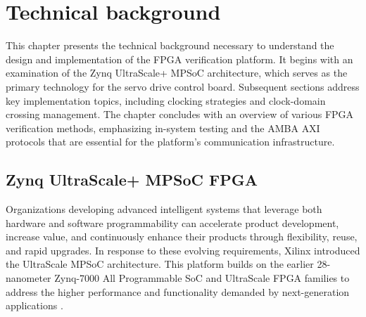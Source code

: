 \chapter{Technical background}
\label{ch:TechBackground}

This chapter presents the technical background necessary to understand the design and implementation of the \acs{FPGA} verification platform. It begins with an examination of the Zynq UltraScale+ \acs{MPSoC} architecture, which serves as the primary technology for the servo drive control board. Subsequent sections address key implementation topics, including clocking strategies and clock-domain crossing management. The chapter concludes with an overview of various \acs{FPGA} verification methods, emphasizing in-system testing and the \acs{AMBA} \acs{AXI} protocols that are essential for the platform's communication infrastructure.

\section{Zynq UltraScale+ \acs{MPSoC} \acs{FPGA}}
\label{sec:TechBackground:Zynq_UltraScale+_MPSoc} 
Organizations developing advanced intelligent systems that leverage both hardware and software programmability can accelerate product development, increase value, and continuously enhance their products through flexibility, reuse, and rapid upgrades. In response to these evolving requirements, Xilinx introduced the UltraScale \acs{MPSoC} architecture. This platform builds on the earlier 28-nanometer Zynq-7000 All Programmable \acs{SoC} and UltraScale \acs{FPGA} families to address the higher performance and functionality demanded by next-generation applications \cite{XilinxUltraScaleMPSoCArchitecture}.

